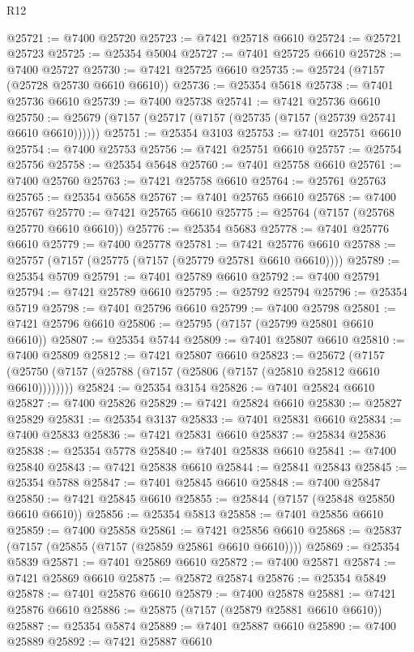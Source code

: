 \begin{lexlean}{R12}
\begin{coremodule}
@25721 := @7400 @25720
@25723 := @7421 @25718 @6610
@25724 := @25721 @25723
@25725 := @25354 @5004
@25727 := @7401 @25725 @6610
@25728 := @7400 @25727
@25730 := @7421 @25725 @6610
@25735 := @25724 (@7157 (@25728 @25730 @6610 @6610))
@25736 := @25354 @5618
@25738 := @7401 @25736 @6610
@25739 := @7400 @25738
@25741 := @7421 @25736 @6610
@25750 := @25679 (@7157 (@25717 (@7157 (@25735 (@7157 (@25739 @25741 @6610 @6610))))))
@25751 := @25354 @3103
@25753 := @7401 @25751 @6610
@25754 := @7400 @25753
@25756 := @7421 @25751 @6610
@25757 := @25754 @25756
@25758 := @25354 @5648
@25760 := @7401 @25758 @6610
@25761 := @7400 @25760
@25763 := @7421 @25758 @6610
@25764 := @25761 @25763
@25765 := @25354 @5658
@25767 := @7401 @25765 @6610
@25768 := @7400 @25767
@25770 := @7421 @25765 @6610
@25775 := @25764 (@7157 (@25768 @25770 @6610 @6610))
@25776 := @25354 @5683
@25778 := @7401 @25776 @6610
@25779 := @7400 @25778
@25781 := @7421 @25776 @6610
@25788 := @25757 (@7157 (@25775 (@7157 (@25779 @25781 @6610 @6610))))
@25789 := @25354 @5709
@25791 := @7401 @25789 @6610
@25792 := @7400 @25791
@25794 := @7421 @25789 @6610
@25795 := @25792 @25794
@25796 := @25354 @5719
@25798 := @7401 @25796 @6610
@25799 := @7400 @25798
@25801 := @7421 @25796 @6610
@25806 := @25795 (@7157 (@25799 @25801 @6610 @6610))
@25807 := @25354 @5744
@25809 := @7401 @25807 @6610
@25810 := @7400 @25809
@25812 := @7421 @25807 @6610
@25823 := @25672
    (@7157 (@25750 (@7157 (@25788 (@7157 (@25806 (@7157 (@25810 @25812 @6610 @6610))))))))
@25824 := @25354 @3154
@25826 := @7401 @25824 @6610
@25827 := @7400 @25826
@25829 := @7421 @25824 @6610
@25830 := @25827 @25829
@25831 := @25354 @3137
@25833 := @7401 @25831 @6610
@25834 := @7400 @25833
@25836 := @7421 @25831 @6610
@25837 := @25834 @25836
@25838 := @25354 @5778
@25840 := @7401 @25838 @6610
@25841 := @7400 @25840
@25843 := @7421 @25838 @6610
@25844 := @25841 @25843
@25845 := @25354 @5788
@25847 := @7401 @25845 @6610
@25848 := @7400 @25847
@25850 := @7421 @25845 @6610
@25855 := @25844 (@7157 (@25848 @25850 @6610 @6610))
@25856 := @25354 @5813
@25858 := @7401 @25856 @6610
@25859 := @7400 @25858
@25861 := @7421 @25856 @6610
@25868 := @25837 (@7157 (@25855 (@7157 (@25859 @25861 @6610 @6610))))
@25869 := @25354 @5839
@25871 := @7401 @25869 @6610
@25872 := @7400 @25871
@25874 := @7421 @25869 @6610
@25875 := @25872 @25874
@25876 := @25354 @5849
@25878 := @7401 @25876 @6610
@25879 := @7400 @25878
@25881 := @7421 @25876 @6610
@25886 := @25875 (@7157 (@25879 @25881 @6610 @6610))
@25887 := @25354 @5874
@25889 := @7401 @25887 @6610
@25890 := @7400 @25889
@25892 := @7421 @25887 @6610

\end{coremodule}
\end{lexlean}
